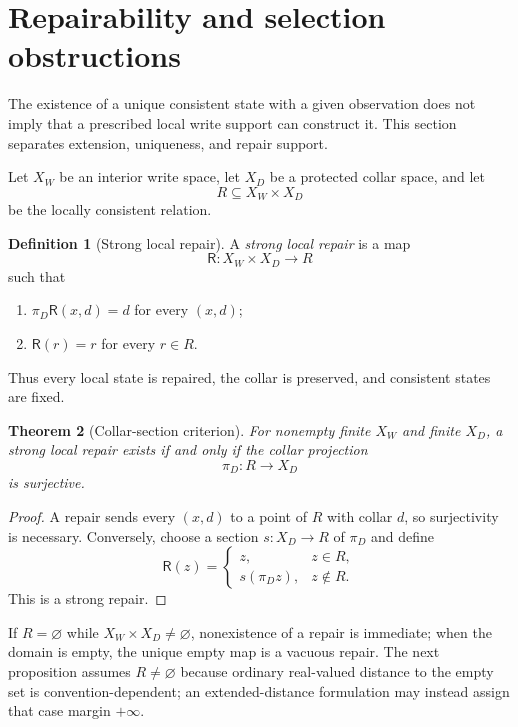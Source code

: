 \documentclass[11pt]{article}
\newtheorem{theorem}{Theorem}[section]
\theoremstyle{definition}
\newtheorem{definition}[theorem]{Definition}
\theoremstyle{remark}
\numberwithin{equation}{section}
\begin{document}
\section{Repairability and selection obstructions}\label{sec:repair}

The existence of a unique consistent state with a given observation does not imply that a prescribed local write support can construct it.  This section separates extension, uniqueness, and repair support.

Let $X_W$ be an interior write space, let $X_D$ be a protected collar space, and let
\[
 R\subseteq X_W\times X_D
\]
be the locally consistent relation.

\begin{definition}[Strong local repair]
A \emph{strong local repair} is a map
\[
 \mathsf R:X_W\times X_D\longrightarrow R
\]
such that
\begin{enumerate}[label=(\roman*)]
\item $\pi_D\mathsf R(x,d)=d$ for every $(x,d)$;
\item $\mathsf R(r)=r$ for every $r\in R$.
\end{enumerate}
Thus every local state is repaired, the collar is preserved, and consistent states are fixed.
\end{definition}

\begin{theorem}[Collar-section criterion]\label{thm:collar-section}
For nonempty finite $X_W$ and finite $X_D$, a strong local repair exists if and only if the collar projection
\[
 \pi_D:R\longrightarrow X_D
\]
is surjective.
\end{theorem}

\begin{proof}
A repair sends every $(x,d)$ to a point of $R$ with collar $d$, so surjectivity is necessary.  Conversely, choose a section $s:X_D\to R$ of $\pi_D$ and define
\[
 \mathsf R(z)=
 \begin{cases}
 z,&z\in R,\\
 s(\pi_Dz),&z\notin R.
 \end{cases}
\]
This is a strong repair.
\end{proof}

If $R=\varnothing$ while $X_W\times X_D\ne\varnothing$, nonexistence of a
repair is immediate; when the domain is empty, the unique empty map is a
vacuous repair.  The next proposition assumes $R\ne\varnothing$ because
ordinary real-valued distance to the empty set is convention-dependent; an
extended-distance formulation may instead assign that case margin $+\infty$.
\end{document}

